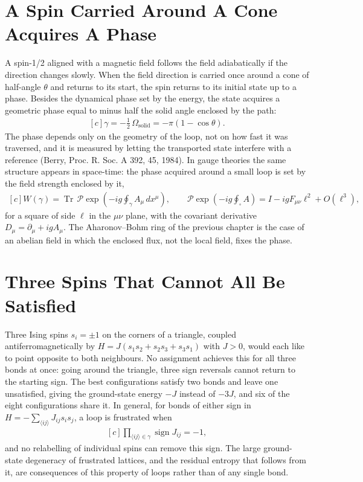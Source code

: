 \documentclass[11pt,oneside]{book}
\newenvironment{centeredalign}{\[\begin{gathered}[c]}{\end{gathered}\]}
\begin{document}
\section{A Spin Carried Around A Cone Acquires A Phase}
A spin-1/2 aligned with a magnetic field follows the field adiabatically if the direction changes slowly. When the
field direction is carried once around a cone of half-angle \(\theta\) and returns to its start, the spin returns to
its initial state up to a phase. Besides the dynamical phase set by the energy, the state acquires a geometric phase
equal to minus half the solid angle enclosed by the path:
\begin{centeredalign}
\gamma=-\tfrac12\,\Omega_{\mathrm{solid}}=-\pi(1-\cos\theta).
\end{centeredalign}
The phase depends only on the geometry of the loop, not on how fast it was traversed, and it is measured by letting the
transported state interfere with a reference (Berry, Proc. R. Soc. A 392, 45, 1984). In gauge theories the same
structure appears in space-time: the phase acquired around a small loop is set by the field strength enclosed by it,
\begin{centeredalign}
W(\gamma)=\operatorname{Tr}\,\mathcal P\exp\!\left(-ig\oint_\gamma A_\mu\,dx^\mu\right),\qquad
\mathcal P\exp\!\left(-ig\oint_{\square}A\right)=I-igF_{\mu\nu}\ell^2+O(\ell^3),
\end{centeredalign}
for a square of side \(\ell\) in the \(\mu\nu\) plane, with the covariant derivative \(D_\mu=\partial_\mu+igA_\mu\). The
Aharonov--Bohm ring of the previous chapter is the case of an abelian field in which the enclosed flux, not the local
field, fixes the phase.

\section{Three Spins That Cannot All Be Satisfied}
Three Ising spins \(s_i=\pm1\) on the corners of a triangle, coupled antiferromagnetically by
\(H=J(s_1s_2+s_2s_3+s_3s_1)\) with \(J>0\), would each like to point opposite to both neighbours. No assignment achieves
this for all three bonds at once: going around the triangle, three sign reversals cannot return to the starting sign.
The best configurations satisfy two bonds and leave one unsatisfied, giving the ground-state energy \(-J\) instead of
\(-3J\), and six of the eight configurations share it. In general, for bonds of either sign in
\(H=-\sum_{\langle ij\rangle}J_{ij}s_is_j\), a loop is frustrated when
\begin{centeredalign}
\prod_{\langle ij\rangle\in\gamma}\operatorname{sign}J_{ij}=-1,
\end{centeredalign}
and no relabelling of individual spins can remove this sign. The large ground-state degeneracy of frustrated lattices,
and the residual entropy that follows from it, are consequences of this property of loops rather than of any single
bond.
\end{document}
